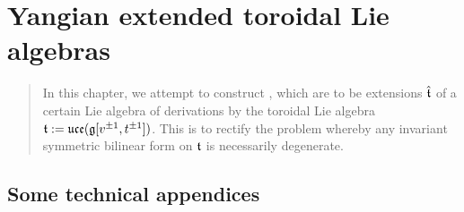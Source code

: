       

       

    \newpage

    \chapter{Yangian extended toroidal Lie algebras} \label{chapter: yangian_EALAs}
        \begin{abstract}
            In this chapter, we attempt to construct , which are to be extensions $\hat{\mathfrak{t}}$ of a certain Lie algebra of derivations by the toroidal Lie algebra $\mathfrak{t} := \mathfrak{uce}(\mathfrak{g}[v^{\pm 1}, t^{\pm 1}])$. This is to rectify the problem whereby any invariant symmetric bilinear form on $\mathfrak{t}$ is necessarily degenerate.
        \end{abstract}

        \minitoc
    
        

        



    \newpage

    \begin{appendices}
        \chapter{Some technical appendices}
            
    \end{appendices}

    \newpage

    \printbibliography

